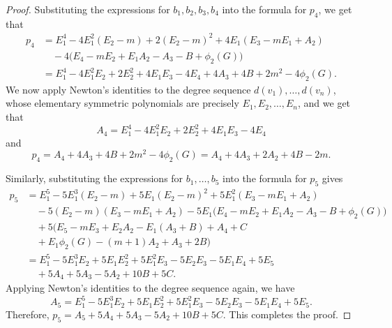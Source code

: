 \documentclass[10pt,a4paper]{amsart}
\begin{document}
\begin{proof}
Substituting the expressions for $b_1,b_2,b_3,b_4$ into the formula for $p_4$, we get that
\begin{align*}
p_4 & = E_1^4-4E_1^2(E_2-m)+2(E_2-m)^2+4E_1(E_3-mE_1+A_2) \\
& \quad -4\bigl(E_4-mE_2+E_1A_2-A_3-B+\phi_2(G)\bigr) \\
& = E_1^4-4E_1^2E_2+2E_2^2+4E_1E_3-4E_4+4A_3+4B+2m^2-4\phi_2(G).
\end{align*}
We now apply Newton's identities to the degree sequence
$d(v_1),\dots,d(v_n)$, whose elementary symmetric polynomials are precisely
$E_1,E_2,\dots, E_n$, and we get that 
\begin{equation*}
A_4=E_1^4-4E_1^2E_2+2E_2^2+4E_1E_3-4E_4
\end{equation*}
and 
\[
p_4 = A_4+4A_3+4B+2m^2-4\phi_2(G) 
= A_4+4A_3+2A_2+4B-2m.
\]

Similarly, substituting the expressions for $b_1,\dots,b_5$ into the formula for $p_5$ gives
\begin{align*}
p_5 & = E_1^5-5E_1^3(E_2-m)+5E_1(E_2-m)^2+5E_1^2(E_3-mE_1+A_2) \\
& \quad -5(E_2-m)(E_3-mE_1+A_2) 
-5E_1\bigl(E_4-mE_2+E_1A_2-A_3-B+\phi_2(G)\bigr) \\
& \quad +5\bigl(E_5-mE_3+E_2A_2-E_1(A_3+B)+A_4+C \\
& \quad +E_1\phi_2(G)-(m+1)A_2+A_3+2B\bigr) \\
& = E_1^5-5E_1^3E_2+5E_1E_2^2+5E_1^2E_3-5E_2E_3-5E_1E_4+5E_5 \\
& \quad +5A_4+5A_3-5A_2+10B+5C.
\end{align*}
Applying Newton's identities to the degree sequence again, we have
\[
A_5=E_1^5-5E_1^3E_2+5E_1E_2^2+5E_1^2E_3-5E_2E_3-5E_1E_4+5E_5.
\]
Therefore, $p_5=A_5+5A_4+5A_3-5A_2+10B+5C$.
This completes the proof.
\end{proof}
\end{document}
